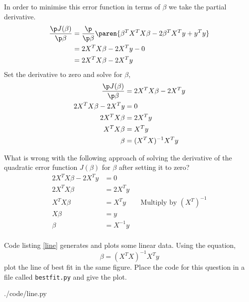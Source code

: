 \documentclass{homework}
\begin{document}
In order to minimise this error function in terms of $\beta$ we take
the partial derivative.
\begin{align*}
  \frac{\p J(\beta)}{\p \beta}
   & = \frac{\p}{\p \beta}\paren{\beta^TX^TX\beta - 2\beta^TX^Ty + y^Ty} \\
   & = 2X^TX\beta - 2X^Ty - 0                                            \\
   & = 2X^TX\beta - 2X^Ty
\end{align*}
Set the derivative to zero and solve for $\beta$,
\begin{align*}
  \frac{\p J(\beta)}{\p \beta} & = 2X^TX\beta - 2X^Ty \\
  2X^TX\beta - 2X^Ty           & = 0                  \\
  2X^TX\beta                   & = 2X^Ty              \\
  X^TX\beta                    & = X^Ty               \\
  \beta                        & = (X^TX)^{-1}X^Ty    \\
\end{align*}

\question What is wrong with the following approach of solving the
derivative of the quadratic error function $J(\beta)$ for $\beta$
after setting it to zero?
\begin{align*}
  2X^TX\beta - 2X^Ty & = 0                                           \\
  2X^TX\beta         & = 2X^Ty                                       \\
  X^TX\beta          & = X^Ty    &  & \text{Multiply by } (X^T)^{-1} \\
  X\beta             & = y                                           \\
  \beta              & = X^{-1}y                                     \\
\end{align*}


\question Code listing \ref{line} generates and plots some linear
data. Using the equation,
\[
  \beta = (X^TX)^{-1}X^Ty
\]
plot the line of best fit in the same figure. Place the code for this
question in a file called \texttt{bestfit.py} and give the plot.


{./code/line.py}

\end{document}
